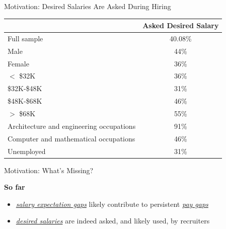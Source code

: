 \begin{frame}{Motivation: Desired Salaries Are Asked During Hiring}
    \begin{table}[h!]
        \footnotesize
        \begin{center}
            \label{tab:BiasiSarsons}
            \begin{tabular}{lc}
            
                & Asked Desired Salary \\
               \hline
               Full sample & 40.08\% \\ \hline
               Male & 44\% \\
               Female & 36\% \\ \hline
               $<$ \$32K & 36\% \\
               \$32K-\$48K & 31\% \\
               \$48K-\$68K & 46\% \\
               $>$ \$68K & 55\% \\ \hline
               Architecture and engineering occupations & 91\% \\
               Computer and mathematical occupations & 46\% \\
               Unemployed & 31\% \\ \hline
            \end{tabular}
        \end{center}
    \end{table}
    \vspace*{-15pt}
    \begin{center}
        {\small \citet[Table A1-A3]{agan2020workers}}
    \end{center}
\end{frame}

\begin{frame}{Motivation: What's Missing?}
    \begin{block}{\textbf{So far}}
        \begin{itemize}
            \item \underline{\textit{salary expectation gaps}} likely contribute to persistent \underline{\textit{pay gaps}} 
            
            \hfill {\scriptsize \citet{babcock2003nice,leibbrandt2015women,biasi2022flexible}}
            \item \underline{\textit{desired salaries}} are indeed asked, and likely used, by recruiters
        \end{itemize}
    \end{block}

\end{frame}

